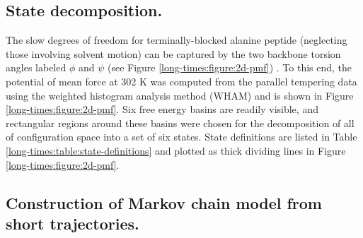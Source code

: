 \subsection{State decomposition.}
\label{long-times:section:state-decomposition}

The slow degrees of freedom for terminally-blocked alanine peptide (neglecting those involving solvent motion) can be captured by the two backbone torsion angles labeled $\phi$ and $\psi$ (see Figure \ref{long-times:figure:2d-pmf}) \cite{bolhuis:2000a,ma:2005a}. To this end, the potential of mean force at 302 K was computed from the parallel tempering data using the weighted histogram analysis method (WHAM) \cite{kumar:1992a,chodera:jctc:2006} and is shown in Figure \ref{long-times:figure:2d-pmf}.  Six free energy basins are readily visible, and rectangular regions around these basins were chosen for the decomposition of all of configuration space into a set of six states.  State definitions are listed in Table \ref{long-times:table:state-definitions} and plotted as thick dividing lines in Figure \ref{long-times:figure:2d-pmf}.

\subsection{Construction of Markov chain model from short trajectories.}
\label{long-times:section:construction-from-short-trajectories}



